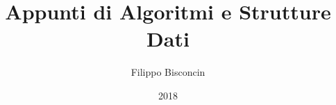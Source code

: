 \documentclass[11pt,a4paper,twoside,openright]{book}
\title{Appunti di Algoritmi e Strutture Dati}
\author{Filippo Bisconcin}
\date{2018}
\begin{document}
\frontmatter

\begin{titlepage}
\maketitle
\end{titlepage}

\pagestyle{plain}
\tableofcontents
\pagestyle{empty}\cleardoublepage
{}

\pagestyle{fancy} 
\fancyfoot{}                                               
\renewcommand{\chaptermark}[1]{\markboth{\chaptername\ \thechapter.\ #1}{}} 
\renewcommand{\sectionmark}[1]{\markright{\thesection.\ #1}}         
\fancyhead[LE,RO]{\bfseries\thepage}    
                                        
\fancyhead[RE]{\bfseries\leftmark}    
\fancyhead[LO]{\bfseries\rightmark}     
\renewcommand{\headrulewidth}{0.3pt} 

\mainmatter




























\backmatter
\end{document}
